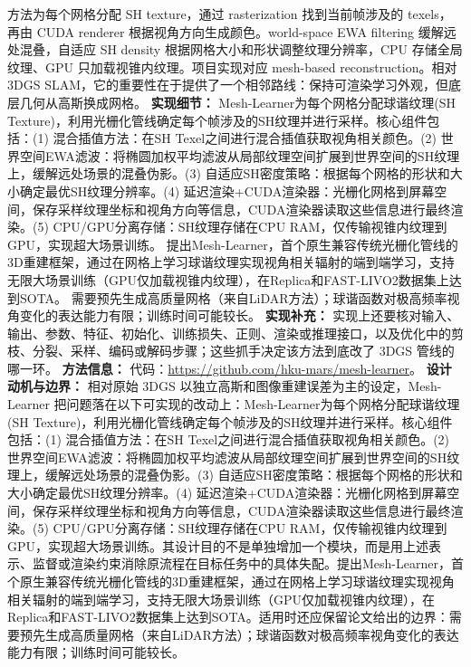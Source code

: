 方法为每个网格分配 SH texture，通过 rasterization 找到当前帧涉及的 texels，再由 CUDA renderer 根据视角方向生成颜色。world-space EWA filtering 缓解远处混叠，自适应 SH density 根据网格大小和形状调整纹理分辨率，CPU 存储全局纹理、GPU 只加载视锥内纹理。项目实现对应 mesh-based reconstruction。相对 3DGS SLAM，它的重要性在于提供了一个相邻路线：保持可渲染学习外观，但底层几何从高斯换成网格。
\textbf{实现细节：} Mesh-Learner为每个网格分配球谐纹理(SH Texture)，利用光栅化管线确定每个帧涉及的SH纹理并进行采样。核心组件包括：(1) 混合插值方法：在SH Texel之间进行混合插值获取视角相关颜色。(2) 世界空间EWA滤波：将椭圆加权平均滤波从局部纹理空间扩展到世界空间的SH纹理上，缓解远处场景的混叠伪影。(3) 自适应SH密度策略：根据每个网格的形状和大小确定最优SH纹理分辨率。(4) 延迟渲染+CUDA渲染器：光栅化网格到屏幕空间，保存采样纹理坐标和视角方向等信息，CUDA渲染器读取这些信息进行最终渲染。(5) CPU/GPU分离存储：SH纹理存储在CPU RAM，仅传输视锥内纹理到GPU，实现超大场景训练。 提出Mesh-Learner，首个原生兼容传统光栅化管线的3D重建框架，通过在网格上学习球谐纹理实现视角相关辐射的端到端学习，支持无限大场景训练（GPU仅加载视锥内纹理），在Replica和FAST-LIVO2数据集上达到SOTA。 需要预先生成高质量网格（来自LiDAR方法）；球谐函数对极高频率视角变化的表达能力有限；训练时间可能较长。
\textbf{实现补充：} 实现上还要核对输入、输出、参数、特征、初始化、训练损失、正则、渲染或推理接口，以及优化中的剪枝、分裂、采样、编码或解码步骤；这些抓手决定该方法到底改了 3DGS 管线的哪一环。
\textbf{方法信息：} 代码：\url{https://github.com/hku-mars/mesh-learner}。
\textbf{设计动机与边界：} 相对原始 3DGS 以独立高斯和图像重建误差为主的设定，Mesh-Learner 把问题落在以下可实现的改动上：Mesh-Learner为每个网格分配球谐纹理(SH Texture)，利用光栅化管线确定每个帧涉及的SH纹理并进行采样。核心组件包括：(1) 混合插值方法：在SH Texel之间进行混合插值获取视角相关颜色。(2) 世界空间EWA滤波：将椭圆加权平均滤波从局部纹理空间扩展到世界空间的SH纹理上，缓解远处场景的混叠伪影。(3) 自适应SH密度策略：根据每个网格的形状和大小确定最优SH纹理分辨率。(4) 延迟渲染+CUDA渲染器：光栅化网格到屏幕空间，保存采样纹理坐标和视角方向等信息，CUDA渲染器读取这些信息进行最终渲染。(5) CPU/GPU分离存储：SH纹理存储在CPU RAM，仅传输视锥内纹理到GPU，实现超大场景训练。其设计目的不是单独增加一个模块，而是用上述表示、监督或渲染约束消除原流程在目标任务中的具体失配。提出Mesh-Learner，首个原生兼容传统光栅化管线的3D重建框架，通过在网格上学习球谐纹理实现视角相关辐射的端到端学习，支持无限大场景训练（GPU仅加载视锥内纹理），在Replica和FAST-LIVO2数据集上达到SOTA。适用时还应保留论文给出的边界：需要预先生成高质量网格（来自LiDAR方法）；球谐函数对极高频率视角变化的表达能力有限；训练时间可能较长。
